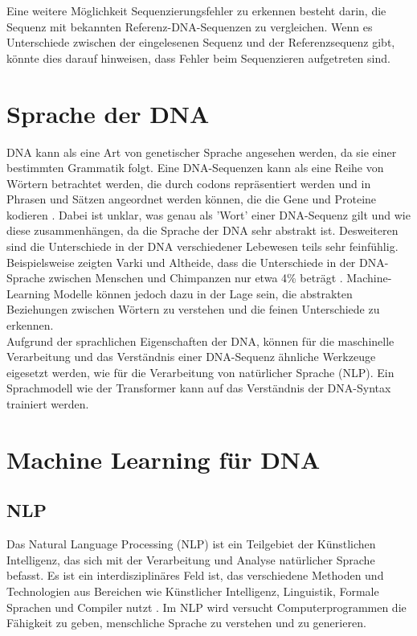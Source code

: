 \documentclass[oneside,bibliography=totocnumbered,BCOR=5mm]{scrbook}%
\theoremstyle{definition}
\theoremstyle{definition}
\theoremstyle{definition}
\theoremstyle{definition}
\theoremstyle{definition}
\theoremstyle{definition}
\begin{document}
Eine weitere Möglichkeit Sequenzierungsfehler zu erkennen
besteht darin, die Sequenz mit bekannten Referenz-DNA-Sequenzen zu vergleichen.
Wenn es Unterschiede zwischen der eingelesenen Sequenz und der Referenzsequenz gibt, 
könnte dies darauf hinweisen, dass Fehler beim Sequenzieren aufgetreten sind. \\


\section{Sprache der DNA}


DNA kann als eine Art von genetischer Sprache angesehen werden, da sie einer bestimmten Grammatik folgt. 
Eine DNA-Sequenzen kann als eine Reihe von Wörtern betrachtet werden, 
die durch codons repräsentiert werden und in Phrasen und Sätzen angeordnet werden können, 
die die Gene und Proteine kodieren \autocite[Seite 584]{dnalinguistic}. Dabei ist unklar, 
was genau als 'Wort' einer DNA-Sequenz gilt und wie diese zusammenhängen, da die Sprache der 
DNA sehr abstrakt ist. Desweiteren sind die Unterschiede in der DNA verschiedener Lebewesen
teils sehr feinfühlig. Beispielsweise zeigten Varki und Altheide, dass die Unterschiede in
der DNA-Sprache zwischen Menschen und Chimpanzen nur etwa 4\% beträgt \autocite[Seite 1748]{genomeDifference}.
Machine-Learning Modelle können jedoch dazu in der Lage sein, die abstrakten 
Beziehungen zwischen Wörtern zu verstehen und die feinen Unterschiede zu erkennen. \\


Aufgrund der sprachlichen Eigenschaften der DNA, können für die maschinelle Verarbeitung und das Verständnis
einer DNA-Sequenz ähnliche Werkzeuge eigesetzt werden, wie für die Verarbeitung von natürlicher Sprache (NLP).
Ein Sprachmodell wie der Transformer kann auf das Verständnis der DNA-Syntax trainiert werden.

\newpage

\section{Machine Learning für DNA}


\subsection{NLP}

Das Natural Language Processing (NLP) ist ein Teilgebiet der Künstlichen Intelligenz, 
das sich mit der Verarbeitung und Analyse natürlicher Sprache befasst. 
Es ist ein interdisziplinäres Feld ist, das verschiedene Methoden und Technologien aus Bereichen wie Künstlicher Intelligenz, 
Linguistik, Formale Sprachen und Compiler nutzt \autocite{NLPfundamentals}.
Im NLP wird versucht Computerprogrammen die Fähigkeit zu geben, menschliche Sprache zu verstehen und zu generieren.  \\
\end{document}
